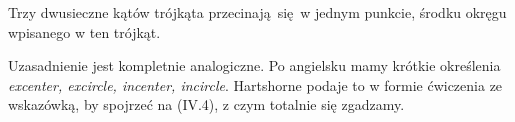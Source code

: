 \begin{proposition}
    Trzy dwusieczne kątów trójkąta przecinają się w jednym punkcie, środku okręgu wpisanego w ten trójkąt.
\end{proposition}

Uzasadnienie jest kompletnie analogiczne.
Po angielsku mamy krótkie określenia \emph{excenter, excircle, incenter, incircle}.
Hartshorne \cite[s. 16]{hartshorne2000} podaje to w formie ćwiczenia ze wskazówką, by spojrzeć na (IV.4), z czym totalnie się zgadzamy.